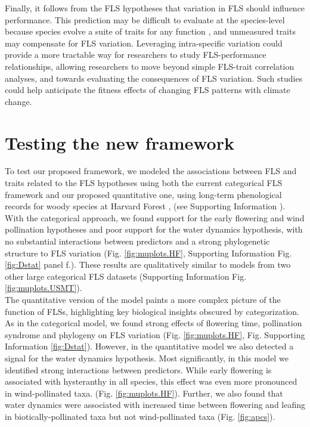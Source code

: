 \documentclass[11pt]{article}
\begin{document}
\noindent Finally, it follows from the FLS hypotheses that variation in FLS should influence performance. This prediction may be difficult to evaluate at the species-level because species evolve a suite of traits for any function \citep{Davies2019}, and unmeasured traits may compensate for FLS variation. Leveraging intra-specific variation could provide a more tractable way for researchers to study FLS-performance relationships, allowing researchers to move beyond simple FLS-trait correlation analyses, and towards evaluating the consequences of FLS variation. Such studies could help anticipate the fitness effects of changing FLS patterns with climate change.\\

\section*{Testing the new framework}

To test our proposed framework, we modeled the associations between FLS and traits related to the FLS hypotheses using both the current categorical FLS framework and our proposed quantitative one, using long-term phenological records for woody species at Harvard Forest \citep{OKeefe2015}, (see Supporting Information ). With the categorical approach, we found support for the early flowering and wind pollination hypotheses and poor support for the water dynamics hypothesis, with no substantial interactions between predictors and a strong phylogenetic structure to FLS variation (Fig. \ref{fig:muplots.HF}, Supporting Information Fig.  \ref{fig:Dstat} panel f.). These results are qualitatively similar to models from two other large categorical FLS datasets (Supporting Information Fig. \ref{fig:muplots.USMT}). \\

\noindent The quantitative version of the model paints a more complex picture of the function of FLSs, highlighting key biological insights obscured by categorization. As in the categorical model, we found strong effects of flowering time, pollination syndrome and phylogeny on FLS variation (Fig. \ref{fig:muplots.HF}, Fig. Supporting Information \ref{fig:Dstat}). However, in the quantitative model we also detected a signal for the water dynamics hypothesis. %
Most significantly, in this model we identified strong interactions between predictors. While early flowering is associated with hysteranthy in all species, this effect was even more pronounced in wind-pollinated taxa. (Fig. \ref{fig:muplots.HF}). Further, we also found that water dynamics were associated with increased time between flowering and leafing in biotically-pollinated taxa but not wind-pollinated taxa (Fig. \ref{fig:apcs}). \\ 
\end{document}
